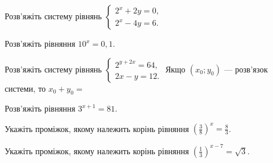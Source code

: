 \documentclass[12pt]{article}
\begin{document}
\begin{samepage}
\noindent\zadnum Розв'яжіть систему рівнянь $\begin{cases} 2^x + 2y = 0, \\ 2^x - 4y = 6. \end{cases}$ 

\nmtnobreak
{}
\par{}
\end{samepage}

\begin{samepage}
\noindent\zadnum Розв'яжіть рівняння $10^x = 0{,}1$. 

\nmtnobreak
{}

\nmtnobreak
\par{}\vspace{0.25cm}
\end{samepage}

\begin{samepage}
\noindent\zadnum Розв'яжіть систему рівнянь $\begin{cases} 2^{y+2x} = 64, \\ 2x - y = 12. \end{cases}$ Якщо $(x_0; y_0)$ --- розв'язок системи, то $x_0 + y_0 =$ 

\nmtnobreak
{}
\par{}
\end{samepage}

\begin{samepage}
\noindent\zadnum Розв'яжіть рівняння $3^{x+1} = 81$. 

\nmtnobreak
{}
\par{}
\end{samepage}

\begin{samepage}
\noindent\zadnum Укажіть проміжок, якому належить корінь рівняння $\left(\displaystyle\frac{3}{8}\right)^x = \displaystyle\frac{8}{3}$. 

\nmtnobreak
{}
\par{}
\end{samepage}

\begin{samepage}
\noindent\zadnum Укажіть проміжок, якому належить корінь рівняння $\left(\displaystyle\frac{1}{3}\right)^{x-7} = \sqrt{3}$. 

\nmtnobreak
{}
\par{}
\end{samepage}
\end{document}

